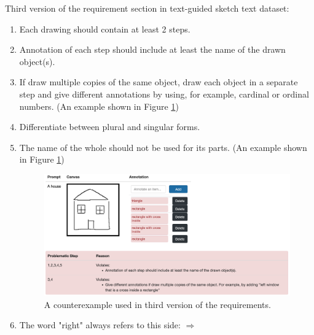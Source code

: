 Third version of the requirement section in text-guided sketch text dataset:
\begin{enumerate}
\item Each drawing should contain at least 2 steps.
\item Annotation of each step should include at least the name of the drawn object(s).
\item If draw multiple copies of the same object, draw each object in a separate step and give different annotations by using, for example, cardinal or ordinal numbers. (An example shown in Figure \ref{v1.requirement_3})
\item Differentiate between plural and singular forms.
\item The name of the whole should not be used for its parts. (An example shown in Figure \ref{v1.requirement_3})
\begin{figure}[!h]
\centering
\includegraphics[width=.8\linewidth]{data_collection/v1_requirement3_bad1.png}  
\caption{A counterexample used in third version of the requirements.}
\label{v1.requirement_3}
\end{figure}
    
\item The word "right" always refers to this side: $\Longrightarrow$
\end{enumerate}




